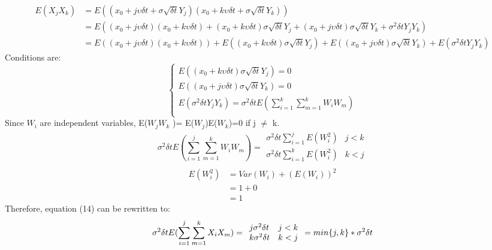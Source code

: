 \documentclass[twoside,11pt]{article}
\begin{document}
\begin{equation}
    \begin{split}
        E(X_{j}X_{k}) &= E((x_{0} +j\upsilon\delta t+\sigma\sqrt{\delta t}Y_{j})(x_{0} +k\upsilon\delta t+\sigma\sqrt{\delta t}Y_{k}))\\
        &= E((x_{0}+ j\upsilon\delta t)(x_{0} +k\upsilon\delta t) + (x_{0} +k\upsilon\delta t)\sigma\sqrt{\delta t}Y_{j} +(x_{0} +j\upsilon\delta t)\sigma\sqrt{\delta t}Y_{k} + \sigma^{2}\delta tY_{j}Y_{k})\\
        &= E((x_{0}+ j\upsilon\delta t)(x_{0} +k\upsilon\delta t)) + E((x_{0} +k\upsilon\delta t)\sigma\sqrt{\delta t}Y_{j})+E((x_{0} +j\upsilon\delta t)\sigma\sqrt{\delta t}Y_{k}) +E(\sigma^{2}\delta tY_{j}Y_{k})
    \end{split}
\end{equation}
Conditions are:
\begin{equation}
\left\{
             \begin{array}{lr}
             E((x_{0} +k\upsilon\delta t)\sigma\sqrt{\delta t}Y_{j}) = 0 \\
             E((x_{0} +j\upsilon\delta t)\sigma\sqrt{\delta t}Y_{k}) =0\\
             E(\sigma^{2}\delta tY_{j}Y_{k}) = \sigma^{2}\delta tE(\sum_{i=1}^{k}\sum_{m=1}^{k}W_{i}W_{m})\\
             \end{array}
\right.
\end{equation}
Since $W_{i}$ are independent variables,  E($W_{j}W_{k}$ )= E($W_{j}$)E($W_{k}$)=0 if j $\neq$ k.
\begin{equation}
    \sigma^{2}\delta tE(\sum_{i=1}^{j}\sum_{m=1}^{k}W_{i}W_{m}) = 
            \begin{array}{lr}
                \sigma^{2}\delta t\sum_{i=1}^{j}E(W_{i}^{2}) &j<k\\
                \sigma^{2}\delta t\sum_{i=1}^{k}E(W_{i}^{2}) &k<j\\
             \end{array}
\end{equation}
\begin{equation}
    \begin{split}
    E(W_{i}^{2}) &= Var(W_{i}) + (E(W_{i}))^{2}\\
    &= 1 + 0\\
    &= 1
    \end{split}
\end{equation}
Therefore, equation (14) can be rewritten to:
\begin{equation}
    \sigma^{2}\delta tE(\sum_{i=1}^{j}\sum_{m=1}^{k}X_{i}X_{m}) = 
            \begin{array}{lr}
                j\sigma^{2}\delta t &j<k\\
                k\sigma^{2}\delta t &k<j\\
             \end{array}\\
    = min\{j,k\}*\sigma^{2}\delta t
\end{equation}
\end{document}
